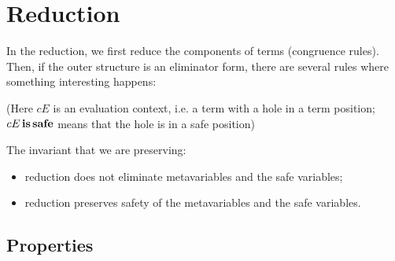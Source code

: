 \documentclass[acmsmall,natbib=false,review,anonymous]{acmart}
\begin{document}
    \ottdefnOkInertLabeled{}
\newpage

\section{Reduction}
  \label{sec:red}
  
  In the reduction, we first reduce the
  components of terms (congruence rules).
  Then, if the outer structure is an eliminator form,
  there are several rules where something interesting happens:
  \begin{ottdefnblock}[]{\ottdefnHeaderRedRed}{}
    \ottusedrule{\ottdruleRedRedAppLamLabeled[]{}}
    \ottusedrule{\ottdruleRedRedAppPLamLabeled[]{}}
    \ottusedrule{\ottdruleRedRedLRedSafeLabeled[]{}}
    \ottusedrule{\ottdruleRedRedLRedNeutLabeled[]{}}
    \ottusedrule{\ottdruleRedRedLRedGrLabeled[]{}}
    \ottusedrule{\ottdruleRedRedLNotinLabeled[]{}}
  \end{ottdefnblock}
  (Here $cE$ is an evaluation context, i.e. a term with a hole 
  in a term position; $cE \, \mathbf{is} \, \mathbf{safe}$ means that the hole is in a safe position)

  The invariant that we are preserving:
  \begin{itemize}
    \item reduction does not eliminate metavariables and the safe variables;
    \item reduction preserves safety of the metavariables and the safe variables.
  \end{itemize}


\subsection{Properties}

\begin{lemma}
\end{lemma}
\end{document}
